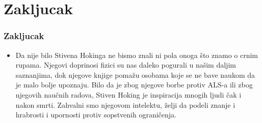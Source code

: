 \documentclass{beamer}
\begin{document}
\section{Zakljucak}
\begin{frame}[fragile]\frametitle{Zakljucak}
\begin{itemize}	 \fontsize{9}{6}\selectfont	
\item  Da nije bilo Stivena Hokinga ne bismo znali ni pola onoga što znamo o crnim rupama. Njegovi doprinosi fizici su nas daleko pogurali u našim daljim saznanjima, dok njegove knjige pomažu osobama koje se ne bave naukom da je malo bolje upoznaju. Bilo da je zbog njegove borbe protiv ALS-a ili zbog njegovih naučnih radova, Stiven Hoking je inspiracija mnogih ljudi čak i nakon smrti. Zahvalni smo njegovom intelektu, želji da podeli znanje i hrabrosti i upornosti protiv sopstvenih ograničenja. 
\end{itemize}
\end{frame}
\end{document}

